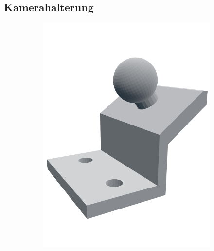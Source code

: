\documentclass[a4paper, 12pt]{scrartcl}
\begin{document}
\subsection{Kamerahalterung}
\begin{figure}[H] 
	\centering
	\begin{subfigure}{.33\textwidth} 
		\centering
		\includegraphics[width=\textwidth]{../3D-Druck_Modelle/Kamerahalterung_neu.png}
	\end{subfigure}%
	\begin{subfigure}{.33\textwidth} 
		\centering

\end{subfigure}
\end{figure}
\end{document}
